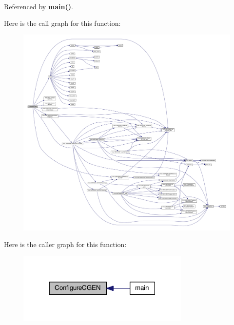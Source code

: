 Referenced by {\bf main()}.



Here is the call graph for this function\+:
\nopagebreak
\begin{figure}[H]
\begin{center}
\leavevmode
\includegraphics[width=350pt]{d4/d8f/pll__sweep_8cpp_a0b6ea8163002a2fc37877ba0a79febf8_cgraph}
\end{center}
\end{figure}




Here is the caller graph for this function\+:
\nopagebreak
\begin{figure}[H]
\begin{center}
\leavevmode
\includegraphics[width=242pt]{d4/d8f/pll__sweep_8cpp_a0b6ea8163002a2fc37877ba0a79febf8_icgraph}
\end{center}
\end{figure}


